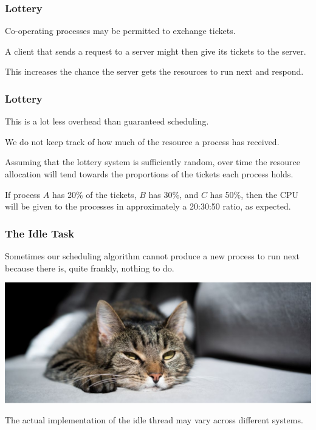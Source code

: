 \begin{frame}
\frametitle{Lottery}

Co-operating processes may be permitted to exchange tickets. 

A client that sends a request to a server might then give its tickets to the server.

This increases the chance the server gets the resources to run next and respond.

\end{frame}

\begin{frame}
\frametitle{Lottery}

This is a lot less overhead than guaranteed scheduling. 

We do not keep track of how much of the resource a process has received. 

Assuming that the lottery system is sufficiently random, over time the resource allocation will tend towards the proportions of the tickets each process holds. 

If process $A$ has 20\% of the tickets, $B$ has 30\%, and $C$ has 50\%, then the CPU will be given to the processes in approximately a 20:30:50 ratio, as expected.


\end{frame}

\begin{frame}
\frametitle{The Idle Task}

Sometimes our scheduling algorithm cannot produce a new process to run next because there is, quite frankly, nothing to do. 

\begin{center}
	\includegraphics[width= \textwidth]{images/bored.jpg}
\end{center}

The actual implementation of the idle thread may vary across different systems. 

\end{frame}

